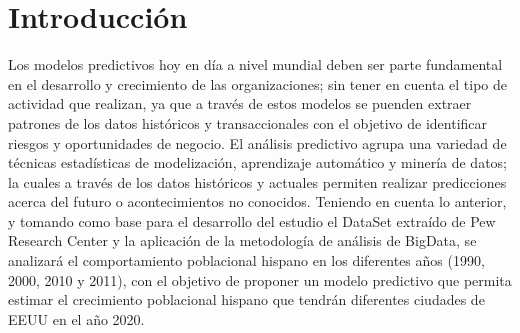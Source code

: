 \section{Introducción}
	Los modelos predictivos hoy en día a nivel mundial deben ser parte fundamental en el desarrollo y crecimiento de las organizaciones; sin tener en cuenta el tipo de actividad que realizan, ya que a través de estos modelos se puenden extraer patrones de los datos históricos y transaccionales con el objetivo de identificar riesgos y oportunidades de negocio. El análisis predictivo agrupa una variedad de técnicas estadísticas de modelización, aprendizaje automático y minería de datos; la cuales  a través de los datos históricos y actuales permiten realizar predicciones acerca del futuro o acontecimientos no conocidos. Teniendo en cuenta lo anterior, y tomando como base para el desarrollo del estudio el DataSet extraído de Pew Research Center y la aplicación de la metodología de análisis de BigData, se analizará el comportamiento poblacional hispano en los diferentes años (1990, 2000, 2010 y 2011), con el objetivo de proponer un modelo predictivo que permita estimar el crecimiento poblacional hispano que tendrán diferentes ciudades de EEUU en el año 2020.
